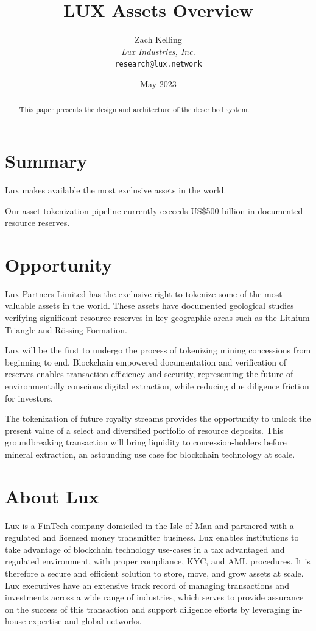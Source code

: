 \documentclass[11pt]{article}
\title{LUX Assets Overview}
\author{Zach Kelling\\\textit{Lux Industries, Inc.}\\\texttt{research@lux.network}}
\date{May 2023}
\begin{document}
\luxcoverpage

\begin{abstract}
This paper presents the design and architecture of the described system.
\end{abstract}

\tableofcontents
\newpage


\section{Summary}

Lux makes available the most exclusive assets in the world.


Our asset tokenization pipeline currently exceeds US\$500 billion in documented resource reserves.


\section{Opportunity}

Lux Partners Limited has the exclusive right to tokenize some of the most valuable assets in the world. These assets have documented geological studies verifying significant resource reserves in key geographic areas such as the Lithium Triangle and Rössing Formation.


Lux will be the first to undergo the process of tokenizing mining concessions from beginning to end. Blockchain empowered documentation and verification of reserves enables transaction efficiency and security, representing the future of environmentally conscious digital extraction, while reducing due diligence friction for investors.


The tokenization of future royalty streams provides the opportunity to unlock the present value of a select and diversified portfolio of resource deposits. This groundbreaking transaction will bring liquidity to concession-holders before mineral extraction, an astounding use case for blockchain technology at scale.


\section{About Lux}

Lux is a FinTech company domiciled in the Isle of Man and partnered with a regulated and licensed money transmitter business. Lux enables institutions to take advantage of blockchain technology use-cases in a tax advantaged and regulated environment, with proper compliance, KYC, and AML procedures. It is therefore a secure and efficient solution to store, move, and grow assets at scale. Lux executives have an extensive track record of managing transactions and investments across a wide range of industries, which serves to provide assurance on the success of this transaction and support diligence efforts by leveraging in-house expertise and global networks.
\end{document}
